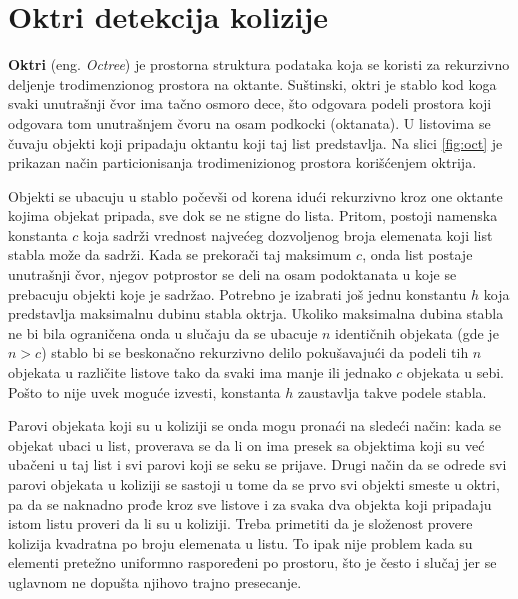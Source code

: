 \documentclass[12pt,oneside]{memoir}
\begin{document}
\section{Oktri detekcija kolizije}
\label{subsec:octree}

\textbf{Oktri} (eng. {\em Octree}) je prostorna struktura podataka koja se koristi za rekurzivno deljenje trodimenzionog prostora na oktante.
Suštinski, oktri je stablo kod koga svaki unutrašnji čvor ima tačno osmoro dece,
što odgovara podeli prostora koji odgovara tom unutrašnjem čvoru na osam podkocki (oktanata).
U listovima se čuvaju objekti koji pripadaju oktantu koji taj list predstavlja.
Na slici \ref{fig:oct} je prikazan način particionisanja trodimenizionog prostora korišćenjem oktrija.

Objekti se ubacuju u stablo počevši od korena idući rekurzivno kroz one oktante kojima objekat pripada,
sve dok se ne stigne do lista.
Pritom, postoji namenska konstanta $c$ koja sadrži vrednost najvećeg dozvoljenog broja elemenata koji list stabla može da sadrži.
Kada se prekorači taj maksimum $c$, onda list postaje unutrašnji čvor, njegov potprostor se deli 
na osam podoktanata u koje se prebacuju objekti koje je sadržao.
Potrebno je izabrati još jednu konstantu $h$ koja predstavlja maksimalnu dubinu stabla oktrja.
Ukoliko maksimalna dubina stabla ne bi bila ograničena onda u slučaju da se ubacuje $n$ identičnih objekata (gde je $n > c$)
stablo bi se beskonačno rekurzivno delilo pokušavajući da podeli tih $n$ objekata u različite listove 
tako da svaki ima manje ili jednako $c$ objekata u sebi. 
Pošto to nije uvek moguće izvesti, konstanta $h$ zaustavlja takve podele stabla.

Parovi objekata koji su u koliziji se onda mogu pronaći na sledeći način:
kada se objekat ubaci u list, proverava se da li on ima presek sa objektima koji su već
ubačeni u taj list i svi parovi koji se seku se prijave.
Drugi način da se odrede svi parovi objekata u koliziji se sastoji u tome da se prvo svi objekti smeste u oktri, 
pa da se naknadno prođe kroz sve listove i za svaka dva objekta koji pripadaju istom listu proveri da li su u koliziji.
Treba primetiti da je složenost provere kolizija kvadratna po broju elemenata u listu.
To ipak nije problem kada su elementi pretežno uniformno raspoređeni po prostoru, što je često 
i slučaj jer se uglavnom ne dopušta njihovo trajno presecanje. 
\end{document}
